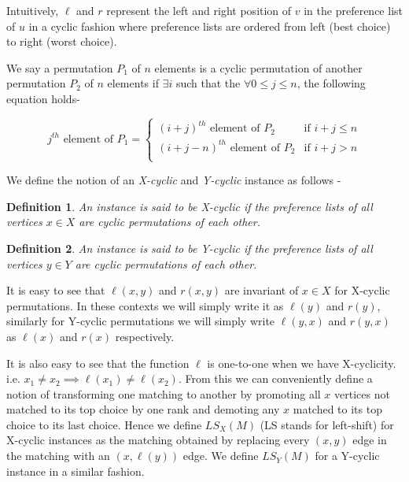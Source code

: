 \documentclass[a4paper,10pt]{article}
\theoremstyle{plain} %
\theoremstyle{plain} %
\newtheorem{definition}{Definition}[section] %
\begin{document}
Intuitively, $\ell$ and $r$ represent the left and right position of $v$ in the preference list of $u$ in a cyclic fashion where preference lists are ordered from left (best choice) to right (worst choice).

We say a permutation $P_1$ of $n$ elements is a cyclic permutation of another permutation $P_2$ of $n$ elements if $\exists i$ such that the $\forall 0 \leq j \leq n$, the following equation holds-

\begin{equation}
    \text{$j^{th}$ element of $P_1$} =
    \begin{cases}
        \text{$(i+j)^{th}$ element of $P_2$} & \text{if $i + j \leq n$} \\
        \text{$(i+j-n)^{th}$ element of $P_2$} & \text{if $i + j > n$} \\
    \end{cases}
\end{equation}

We define the notion of an \textit{X-cyclic} and \textit{Y-cyclic} instance as follows - 
\begin{definition}
    An instance is said to be X-cyclic if the preference lists of all vertices $x \in X$ are cyclic permutations of each other.
\end{definition}

\begin{definition}
    An instance is said to be Y-cyclic if the preference lists of all vertices $y \in Y$ are cyclic permutations of each other.
\end{definition}
    
It is easy to see that $\ell(x, y)$ and $r(x, y)$ are invariant of $x \in X$ for X-cyclic permutations. In these contexts we will simply write it as $\ell(y)$ and $r(y)$, similarly for Y-cyclic permutations we will simply write $\ell(y, x)$ and $r(y, x)$ as $\ell(x)$ and $r(x)$ respectively.

It is also easy to see that the function $\ell$ is one-to-one when we have X-cyclicity. i.e. $x_1 \neq x_2 \implies \ell(x_1) \neq \ell(x_2)$. From this we can conveniently define a notion of transforming one matching to another by promoting all $x$ vertices not matched to its top choice by one rank and demoting any $x$ matched to its top choice to its last choice. Hence we define $LS_X(M)$ (LS stands for left-shift) for X-cyclic instances as the matching obtained by replacing every $(x, y)$ edge in the matching with an $(x, \ell(y))$ edge. We define $LS_Y(M)$ for a Y-cyclic instance in a similar fashion.
\end{document}
